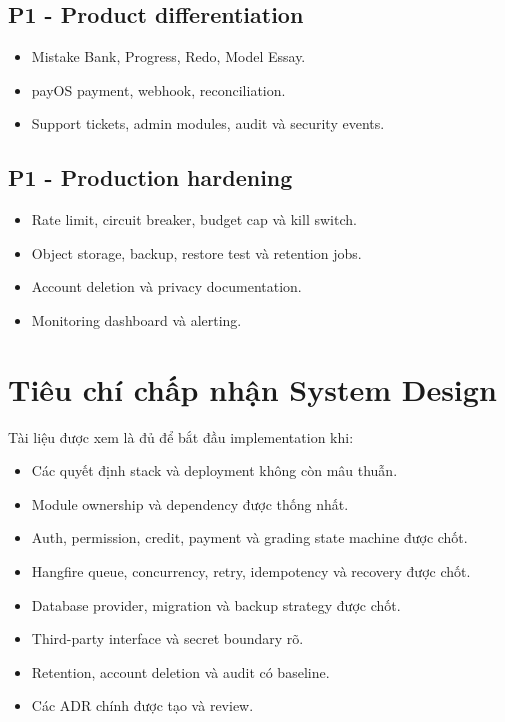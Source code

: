 \documentclass[11pt,a4paper]{article}
\begin{document}
\subsection{P1 - Product differentiation}
\begin{itemize}
  \item Mistake Bank, Progress, Redo, Model Essay.
  \item payOS payment, webhook, reconciliation.
  \item Support tickets, admin modules, audit và security events.
\end{itemize}

\subsection{P1 - Production hardening}
\begin{itemize}
  \item Rate limit, circuit breaker, budget cap và kill switch.
  \item Object storage, backup, restore test và retention jobs.
  \item Account deletion và privacy documentation.
  \item Monitoring dashboard và alerting.
\end{itemize}

\section{Tiêu chí chấp nhận System Design}

Tài liệu được xem là đủ để bắt đầu implementation khi:
\begin{itemize}
  \item Các quyết định stack và deployment không còn mâu thuẫn.
  \item Module ownership và dependency được thống nhất.
  \item Auth, permission, credit, payment và grading state machine được chốt.
  \item Hangfire queue, concurrency, retry, idempotency và recovery được chốt.
  \item Database provider, migration và backup strategy được chốt.
  \item Third-party interface và secret boundary rõ.
  \item Retention, account deletion và audit có baseline.
  \item Các ADR chính được tạo và review.
\end{itemize}
\end{document}

